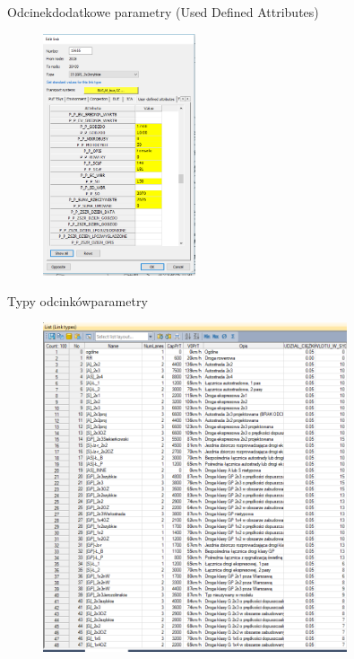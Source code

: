 \documentclass[8pt]{beamer}
\begin{document}
\begin{frame}{Odcinek}{dodatkowe parametry (Used Defined Attributes)}
\begin{figure}\begin{center}
\includegraphics[width=0.4\textwidth]{link2}
 \end{center}  \end{figure} 
\end{frame}

\begin{frame}{Typy odcinków}{parametry}
\begin{figure}\begin{center}
\includegraphics[width=0.8\textwidth]{link_types}
 \end{center}  \end{figure} 
\end{frame}
\end{document}
